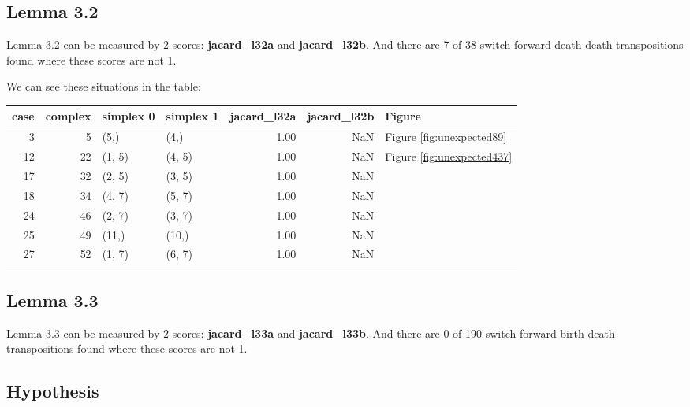 \documentclass{article}
\begin{document}
\subsection{Lemma 3.2}

\par Lemma 3.2 can be measured by 2 scores: \textbf{jacard\_l32a} and \textbf{jacard\_l32b}.
And there are 7 of 38 switch-forward death-death transpositions found where these scores are not 1.
\par We can see these situations in the table:
\begin{center}\begin{tabular}{rrllrrl}
\toprule
case & complex & simplex 0 & simplex 1 & jacard\_l32a & jacard\_l32b & Figure \\
\midrule
3 & 5 & (5,) & (4,) & 1.00 & NaN & Figure \ref{fig:unexpected89} \\
12 & 22 & (1, 5) & (4, 5) & 1.00 & NaN & Figure \ref{fig:unexpected437} \\
17 & 32 & (2, 5) & (3, 5) & 1.00 & NaN &  \\
18 & 34 & (4, 7) & (5, 7) & 1.00 & NaN &  \\
24 & 46 & (2, 7) & (3, 7) & 1.00 & NaN &  \\
25 & 49 & (11,) & (10,) & 1.00 & NaN &  \\
27 & 52 & (1, 7) & (6, 7) & 1.00 & NaN &  \\
\bottomrule
\end{tabular}
\end{center}
\subsection{Lemma 3.3}

\par Lemma 3.3 can be measured by 2 scores: \textbf{jacard\_l33a} and \textbf{jacard\_l33b}.
And there are 0 of 190 switch-forward birth-death transpositions found where these scores are not 1.

\subsection{Hypothesis}
\end{document}
